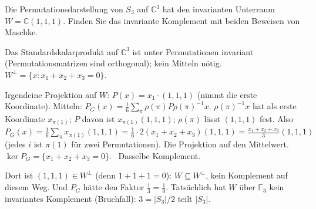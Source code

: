 \begin{aufgabe}
Die Permutationsdarstellung von $S_3$ auf $\mathbb C^{3}$ hat den invarianten Unterraum $W = \mathbb C(1, 1, 1)$. Finden Sie das invariante Komplement mit beiden Beweisen von Maschke.

\loesung
{}
Das Standardskalarprodukt auf $\mathbb C^{3}$ ist unter Permutationen invariant (Permutationsmatrizen sind orthogonal); kein Mitteln nötig. $W^{\perp} = \{x : x_1 + x_2 + x_3 = 0\}$. \checkmark

Irgendeine Projektion auf $W$: $P(x) = x_1\cdot(1, 1, 1)$ (nimmt die erste Koordinate). Mitteln: $P_G(x) = \frac16\sum_\pi\rho(\pi)P\rho(\pi)^{-1}x$. $\rho(\pi)^{-1}x$ hat als erste Koordinate $x_{\pi(1)}$; $P$ davon ist $x_{\pi(1)}(1,1,1)$; $\rho(\pi)$ lässt $(1,1,1)$ fest. Also $P_G(x) = \frac16\sum_\pi x_{\pi(1)}(1,1,1) = \frac16\cdot2(x_1 + x_2 + x_3)(1,1,1) = \frac{x_1 + x_2 + x_3}{3}(1, 1, 1)$ (jedes $i$ ist $\pi(1)$ für zwei Permutationen). Die Projektion auf den Mittelwert. $\ker P_G = \{x_1 + x_2 + x_3 = 0\}$. \checkmark\ Dasselbe Komplement.

Dort ist $(1, 1, 1)\in W^{\perp}$ (denn $1 + 1 + 1 = 0$): $W\subseteq W^{\perp}$, kein Komplement auf diesem Weg. Und $P_G$ hätte den Faktor $\frac13 = \frac10$. Tatsächlich hat $W$ über $\mathbb F_3$ kein invariantes Komplement (Bruchfall): $3 = |S_3|/2$ teilt $|S_3|$.

\begin{center}
\begin{minipage}{0.88\textwidth}
\end{minipage}
\end{center}
\end{aufgabe}


